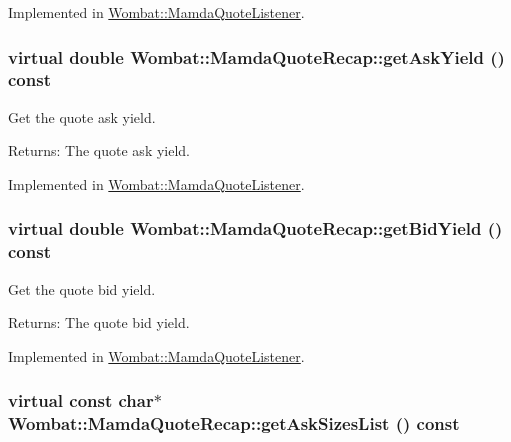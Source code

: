 Implemented in \hyperlink{classWombat_1_1MamdaQuoteListener_d9c60e9325eaaa4ae2b5af91201dfb3f}{Wombat::Mamda\-Quote\-Listener}.\hypertarget{classWombat_1_1MamdaQuoteRecap_2c27e50701aa2a56fa132d81a6b4be42}{
\subsubsection[getAskYield]{\setlength{\rightskip}{0pt plus 5cm}virtual double Wombat::Mamda\-Quote\-Recap::get\-Ask\-Yield () const}}
\label{classWombat_1_1MamdaQuoteRecap_2c27e50701aa2a56fa132d81a6b4be42}


Get the quote ask yield. 

\begin{Desc}
\item[Returns:]The quote ask yield. \end{Desc}


Implemented in \hyperlink{classWombat_1_1MamdaQuoteListener_49a6a64974327a037d1470cf433d93e0}{Wombat::Mamda\-Quote\-Listener}.\hypertarget{classWombat_1_1MamdaQuoteRecap_29c021892c5abee2c716d01f15b7b6fe}{
\subsubsection[getBidYield]{\setlength{\rightskip}{0pt plus 5cm}virtual double Wombat::Mamda\-Quote\-Recap::get\-Bid\-Yield () const}}
\label{classWombat_1_1MamdaQuoteRecap_29c021892c5abee2c716d01f15b7b6fe}


Get the quote bid yield. 

\begin{Desc}
\item[Returns:]The quote bid yield. \end{Desc}


Implemented in \hyperlink{classWombat_1_1MamdaQuoteListener_17999949e20889d0d319e71874949d25}{Wombat::Mamda\-Quote\-Listener}.\hypertarget{classWombat_1_1MamdaQuoteRecap_0f3dfc61d4c0ce17a69505bdb0977267}{
\subsubsection[getAskSizesList]{\setlength{\rightskip}{0pt plus 5cm}virtual const char$\ast$ Wombat::Mamda\-Quote\-Recap::get\-Ask\-Sizes\-List () const}}
\label{classWombat_1_1MamdaQuoteRecap_0f3dfc61d4c0ce17a69505bdb0977267}


